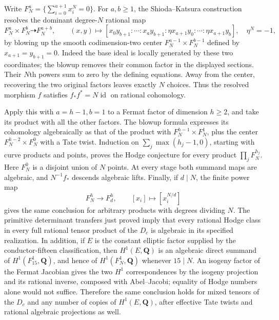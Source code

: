 \documentclass[11pt]{article}
\theoremstyle{definition}
\newcommand{\Q}{\mathbf Q}
\newcommand{\id}{\operatorname{id}}
\begin{document}
Write $F_N^a=\{\sum_{i=0}^{a+1}x_i^N=0\}$. For $a,b\geq1$,
the Shioda--Katsura construction \cite[Lemma 1.2 and Theorem 1.7]{SK}
resolves the dominant degree-$N$ rational map
\[
 F_N^a\times F_N^b\dashrightarrow F_N^{a+b},\qquad
 (x,y)\longmapsto
 [x_0y_{b+1}:\cdots:x_a y_{b+1}:
   \eta x_{a+1}y_0:\cdots:\eta x_{a+1}y_b],
 \quad\eta^N=-1,
\]
by blowing up the smooth codimension-two center
$F_N^{a-1}\times F_N^{b-1}$ defined by
$x_{a+1}=y_{b+1}=0$. Indeed the base ideal is locally generated by
these two coordinates; the blowup removes their common factor in the
displayed sections. Their $N$th powers sum to zero by the defining
equations. Away from the center, recovering the two original factors
leaves exactly $N$ choices. Thus the resolved morphism $f$ satisfies
$f_*f^*=N\id$ on rational cohomology.

Apply this with $a=h-1,b=1$ to a Fermat factor of dimension $h\geq2$,
and take its product with all the other factors. The blowup formula
expresses its cohomology algebraically as that of the product with
$F_N^{h-1}\times F_N^1$, plus the center
$F_N^{h-2}\times F_N^0$ with a Tate twist. Induction on
$\sum_j\max(h_j-1,0)$, starting with curve products and points,
proves the Hodge conjecture for every product $\prod_jF_N^{h_j}$.
Here $F_N^0$ is a disjoint union of $N$ points. At every stage both
summand maps are algebraic, and $N^{-1}f_*$ descends algebraic lifts.
Finally, if $d\mid N$, the finite power map
\[
 F_N^h\longrightarrow F_d^h,\qquad [x_i]\longmapsto[x_i^{N/d}]
\]
gives the same conclusion for arbitrary products with degrees dividing
$N$. The primitive determinant transfers just proved imply that every
rational Hodge class in every full rational tensor product of the
$D_c$ is algebraic in its specified realization. In addition, if $E$
is the constant elliptic factor supplied by the conductor-fifteen
classification, then $H^1(E,\Q)$ is an algebraic direct summand of
$H^1(F_{15}^1,\Q)$, and hence of $H^1(F_N^1,\Q)$ whenever $15\mid N$.
An isogeny factor of the Fermat Jacobian gives the two $H^1$
correspondences by the isogeny projection and its rational inverse,
composed with Abel--Jacobi; equality of Hodge numbers alone would not
suffice. Therefore the same conclusion holds for mixed tensors of the
$D_c$ and any number of copies of $H^1(E,\Q)$, after effective Tate
twists and rational algebraic projections as well.
\end{document}
